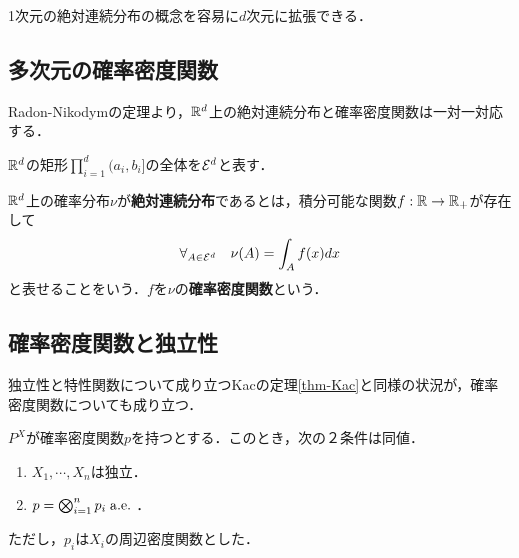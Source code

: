 \documentclass[uplatex,dvipdfmx]{jsreport}
\begin{document}
\begin{tcolorbox}[colframe=ForestGreen, colback=ForestGreen!10!white,breakable,colbacktitle=ForestGreen!40!white,coltitle=black,fonttitle=\bfseries\sffamily,
title=]
    1次元の絶対連続分布の概念を容易に$d$次元に拡張できる．
\end{tcolorbox}

\subsection{多次元の確率密度関数}

\begin{tcolorbox}[colframe=ForestGreen, colback=ForestGreen!10!white,breakable,colbacktitle=ForestGreen!40!white,coltitle=black,fonttitle=\bfseries\sffamily,
title=]
    Radon-Nikodymの定理より，$\mathbb{R}^d$上の絶対連続分布と確率密度関数は一対一対応する．
\end{tcolorbox}

\begin{notation}
    $\mathbb{R}^d$の矩形$\prod^d_{i=1}(a_i,b_i]$の全体を$\mathcal{E}^d$と表す．
\end{notation}

\begin{definition}
    $\mathbb{R}^d$上の確率分布$\nu$が\textbf{絶対連続分布}であるとは，積分可能な関数$f:\mathbb{R}\to\mathbb{R}_+$が存在して
    \[\forall_{A\in\mathcal{E}^d}\quad\nu(A)=\int_Af(x)dx\]
    と表せることをいう．$f$を$\nu$の\textbf{確率密度関数}という．
\end{definition}

\subsection{確率密度関数と独立性}

\begin{tcolorbox}[colframe=ForestGreen, colback=ForestGreen!10!white,breakable,colbacktitle=ForestGreen!40!white,coltitle=black,fonttitle=\bfseries\sffamily,
title=]
    独立性と特性関数について成り立つKacの定理\ref{thm-Kac}と同様の状況が，確率密度関数についても成り立つ．
\end{tcolorbox}

\begin{proposition}[独立性の確率密度関数による特徴付け]
    $P^X$が確率密度関数$p$を持つとする．このとき，次の２条件は同値．
    \begin{enumerate}
        \item $X_1,\cdots,X_n$は独立．
        \item $p=\bigotimes^n_{i=1}p_i\;\mathrm{a.e.}\;$．
    \end{enumerate}
    ただし，$p_i$は$X_i$の周辺密度関数とした．
\end{proposition}
\end{document}

